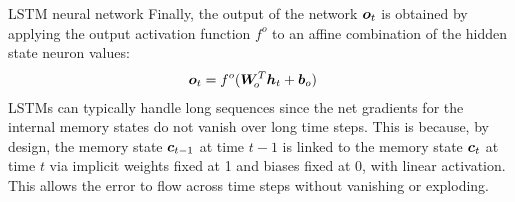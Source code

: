 \begin{frame}{LSTM neural network}
Finally, the
output of the network ${\boldsymbol o}_t$ is obtained by applying the output
activation function $f^o$ to an affine combination of the hidden state
neuron values:
\begin{align*}
    {\boldsymbol o}_t & = f^o({\boldsymbol W}_{\!o}^T{\boldsymbol h}_t + {\boldsymbol b}_{o})
\end{align*}
%
LSTMs can typically handle long sequences since the net gradients for
the internal memory states do not vanish over long time steps. This is
because, by design, the memory state ${\boldsymbol c}_{t-1}$ at time $t-1$ is linked
to the memory state ${\boldsymbol c}_t$ at time $t$ via implicit weights fixed at 1
and biases fixed at 0, with linear activation. 
This allows the error to flow across
time steps without vanishing or exploding.
\end{frame}
%
%
%
